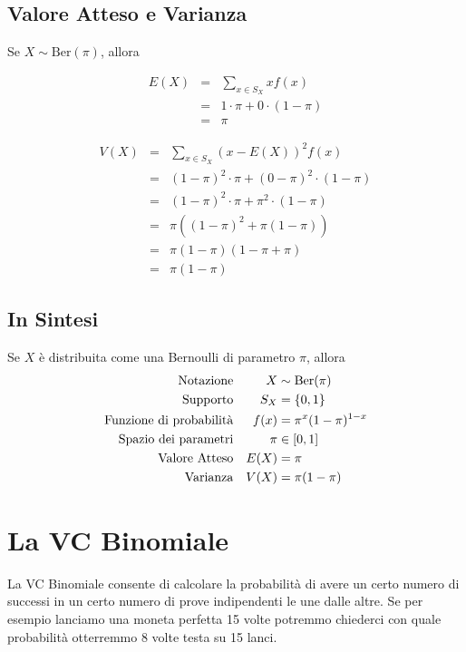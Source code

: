 \documentclass[
  11pt,
]{book}
\theoremstyle{mytheoremstyle}
\theoremstyle{mydefstyle}
\begin{document}
\subsection{Valore Atteso e Varianza}\label{valore-atteso-e-varianza}

Se \(X\sim\text{Ber}(\pi)\), allora

\begin{eqnarray*}
E(X) &=& \sum_{x\in S_X} xf(x)\\
 &=& 1\cdot\pi+0\cdot(1-\pi)\\
 &=& \pi
\end{eqnarray*}

\begin{eqnarray*}
V(X) &=& \sum_{x\in S_X} (x-E(X))^2f(x)\\
 &=& (1-\pi)^2\cdot\pi+(0-\pi)^2\cdot(1-\pi)\\
 &=& (1-\pi)^2\cdot\pi+\pi^2\cdot(1-\pi)\\
 &=& \pi((1-\pi)^2+\pi(1-\pi))\\
 &=& \pi(1-\pi)(1-\pi+\pi)\\
 &=& \pi(1-\pi)
\end{eqnarray*}

\subsection{In Sintesi}\label{in-sintesi}

\begin{info}
Se \(X\) è distribuita come una Bernoulli di parametro \(\pi\), allora
\begin{align*}
\text{Notazione} & & X&\sim\text{\rm Ber}(\pi)\\
\text{Supporto} & & S_X &=\{0,1\}\\
\text{Funzione di probabilità} & & f(x)&=\pi^x(1-\pi)^{1-x}\\
\text{Spazio dei parametri} & & \pi&\in[0,1]\\
\text{Valore Atteso} & & E(X)&=\pi\\
\text{Varianza} & & V(X)&=\pi(1-\pi)
\end{align*}

\end{info}

\section{La VC Binomiale}\label{la-vc-binomiale}

La VC Binomiale consente di calcolare la probabilità di avere un certo numero di successi
in un certo numero di prove indipendenti le une dalle altre.
Se per esempio lanciamo una moneta perfetta 15 volte potremmo chiederci con quale probabilità
otterremmo 8 volte testa su 15 lanci.
\end{document}
